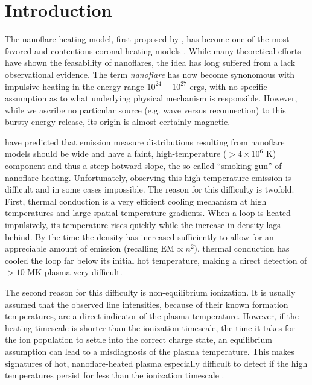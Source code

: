 \documentclass[tighten,apj]{emulateapj}
\begin{document}
	\section{Introduction}
	\label{sec:intro}
	\par The nanoflare heating model, first proposed by \citet{parker_nanoflares_1988}, has become one of the most favored and contentious coronal heating models \citep{cargill_implications_1994,cargill_nanoflare_2004,klimchuk_solving_2006}. While many theoretical efforts \citep[e.g.][]{bradshaw_diagnosing_2012,reep_diagnosing_2013} have shown the feasability of nanoflares, the idea has long suffered from a lack observational evidence. The term \textit{nanoflare} has now become synonomous with impulsive heating in the energy range $10^{24}-10^{27}$ ergs, with no specific assumption as to what underlying physical mechanism is responsible. However, while we ascribe no particular source (e.g. wave versus reconnection) to this bursty energy release, its origin is almost certainly magnetic.
	\par \citet{cargill_implications_1994,cargill_nanoflare_2004} have predicted that emission measure distributions resulting from nanoflare models should be wide and have a faint, high-temperature ($>4\times10^6$ K) component and thus a steep hotward slope, the so-called ``smoking gun'' of nanoflare heating. Unfortunately, observing this high-temperature emission is difficult and in some cases impossible. The reason for this difficulty is twofold. First, thermal conduction is a very efficient cooling mechanism at high temperatures and large spatial temperature gradients. When a loop is heated impulsively, its temperature rises quickly while the increase in density lags behind. By the time the density has increased sufficiently to allow for an appreciable amount of emission (recalling $\mathrm{EM}\propto n^2$), thermal conduction has cooled the loop far below its initial hot temperature, making a direct detection of $>10$ MK plasma very difficult. 
	\par The second reason for this difficulty is non-equilibrium ionization. It is usually assumed that the observed line intensities, because of their known formation temperatures, are a direct indicator of the plasma temperature. However, if the heating timescale is shorter than the ionization timescale, the time it takes for the ion population to settle into the correct charge state, an equilibrium assumption can lead to a misdiagnosis of the plasma temperature. This makes signatures of hot, nanoflare-heated plasma especially difficult to detect if the high temperatures persist for less than the ionization timescale \citep{bradshaw_explosive_2006,bradshaw_what_2011,reale_nonequilibrium_2008}.
\end{document}
